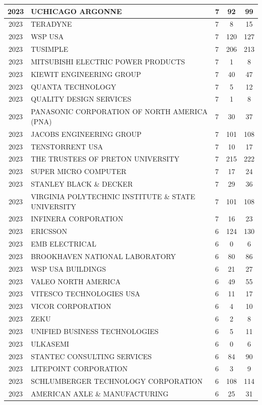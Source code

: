 \documentclass{article}%
\begin{document}
\begin{longtable}{c|p{20em}|p{5em}|c|c}
\hline%
2023&UCHICAGO ARGONNE&7&92&99\\%
\hline%
2023&TERADYNE&7&8&15\\%
\hline%
2023&WSP USA&7&120&127\\%
\hline%
2023&TUSIMPLE&7&206&213\\%
\hline%
2023&MITSUBISHI ELECTRIC POWER PRODUCTS&7&1&8\\%
\hline%
2023&KIEWIT ENGINEERING GROUP&7&40&47\\%
\hline%
2023&QUANTA TECHNOLOGY&7&5&12\\%
\hline%
2023&QUALITY DESIGN SERVICES&7&1&8\\%
\hline%
2023&PANASONIC CORPORATION OF NORTH AMERICA (PNA)&7&30&37\\%
\hline%
2023&JACOBS ENGINEERING GROUP&7&101&108\\%
\hline%
2023&TENSTORRENT USA&7&10&17\\%
\hline%
2023&THE TRUSTEES OF PRETON UNIVERSITY&7&215&222\\%
\hline%
2023&SUPER MICRO COMPUTER&7&17&24\\%
\hline%
2023&STANLEY BLACK \& DECKER&7&29&36\\%
\hline%
2023&VIRGINIA POLYTECHNIC INSTITUTE \& STATE UNIVERSITY&7&101&108\\%
\hline%
2023&INFINERA CORPORATION&7&16&23\\%
\hline%
2023&ERICSSON&6&124&130\\%
\hline%
2023&EMB ELECTRICAL&6&0&6\\%
\hline%
2023&BROOKHAVEN NATIONAL LABORATORY&6&80&86\\%
\hline%
2023&WSP USA BUILDINGS&6&21&27\\%
\hline%
2023&VALEO NORTH AMERICA&6&49&55\\%
\hline%
2023&VITESCO TECHNOLOGIES USA&6&11&17\\%
\hline%
2023&VICOR CORPORATION&6&4&10\\%
\hline%
2023&ZEKU&6&2&8\\%
\hline%
2023&UNIFIED BUSINESS TECHNOLOGIES&6&5&11\\%
\hline%
2023&ULKASEMI&6&0&6\\%
\hline%
2023&STANTEC CONSULTING SERVICES&6&84&90\\%
\hline%
2023&LITEPOINT CORPORATION&6&3&9\\%
\hline%
2023&SCHLUMBERGER TECHNOLOGY CORPORATION&6&108&114\\%
\hline%
2023&AMERICAN AXLE \& MANUFACTURING&6&25&31\\%
\hline%

\end{longtable}
\end{document}
